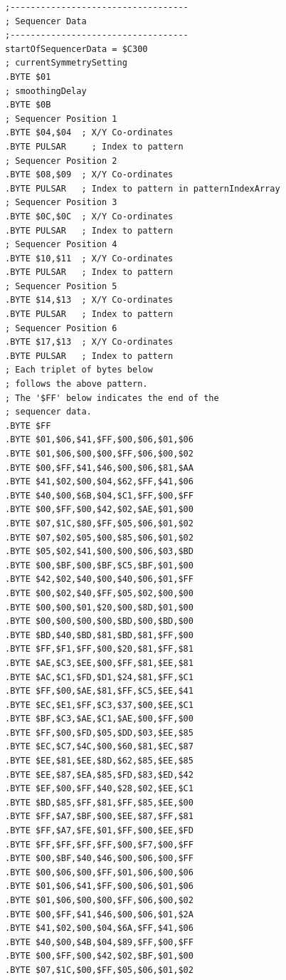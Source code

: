 \clearpage
\begin{minipage}[b]{0.33\linewidth}
\begin{lrbox}{\mybox}%
\begin{lstlisting}[basicstyle=\ttfamily\tiny]
;-----------------------------------
; Sequencer Data
;-----------------------------------
startOfSequencerData = $C300
; currentSymmetrySetting
.BYTE $01
; smoothingDelay
.BYTE $0B
; Sequencer Position 1
.BYTE $04,$04  ; X/Y Co-ordinates
.BYTE PULSAR     ; Index to pattern    
; Sequencer Position 2
.BYTE $08,$09  ; X/Y Co-ordinates
.BYTE PULSAR   ; Index to pattern in patternIndexArray   
; Sequencer Position 3
.BYTE $0C,$0C  ; X/Y Co-ordinates
.BYTE PULSAR   ; Index to pattern
; Sequencer Position 4
.BYTE $10,$11  ; X/Y Co-ordinates
.BYTE PULSAR   ; Index to pattern
; Sequencer Position 5
.BYTE $14,$13  ; X/Y Co-ordinates
.BYTE PULSAR   ; Index to pattern
; Sequencer Position 6
.BYTE $17,$13  ; X/Y Co-ordinates
.BYTE PULSAR   ; Index to pattern
; Each triplet of bytes below
; follows the above pattern.
; The '$FF' below indicates the end of the
; sequencer data.
.BYTE $FF
.BYTE $01,$06,$41,$FF,$00,$06,$01,$06
.BYTE $01,$06,$00,$00,$FF,$06,$00,$02
.BYTE $00,$FF,$41,$46,$00,$06,$81,$AA
.BYTE $41,$02,$00,$04,$62,$FF,$41,$06
.BYTE $40,$00,$6B,$04,$C1,$FF,$00,$FF
.BYTE $00,$FF,$00,$42,$02,$AE,$01,$00
.BYTE $07,$1C,$80,$FF,$05,$06,$01,$02
.BYTE $07,$02,$05,$00,$85,$06,$01,$02
.BYTE $05,$02,$41,$00,$00,$06,$03,$BD
.BYTE $00,$BF,$00,$BF,$C5,$BF,$01,$00
.BYTE $42,$02,$40,$00,$40,$06,$01,$FF
.BYTE $00,$02,$40,$FF,$05,$02,$00,$00
.BYTE $00,$00,$01,$20,$00,$8D,$01,$00
.BYTE $00,$00,$00,$00,$BD,$00,$BD,$00
.BYTE $BD,$40,$BD,$81,$BD,$81,$FF,$00
.BYTE $FF,$F1,$FF,$00,$20,$81,$FF,$81
.BYTE $AE,$C3,$EE,$00,$FF,$81,$EE,$81
.BYTE $AC,$C1,$FD,$D1,$24,$81,$FF,$C1
.BYTE $FF,$00,$AE,$81,$FF,$C5,$EE,$41
.BYTE $EC,$E1,$FF,$C3,$37,$00,$EE,$C1
.BYTE $BF,$C3,$AE,$C1,$AE,$00,$FF,$00
.BYTE $FF,$00,$FD,$05,$DD,$03,$EE,$85
.BYTE $EC,$C7,$4C,$00,$60,$81,$EC,$87
.BYTE $EE,$81,$EE,$8D,$62,$85,$EE,$85
.BYTE $EE,$87,$EA,$85,$FD,$83,$ED,$42
.BYTE $EF,$00,$FF,$40,$28,$02,$EE,$C1
.BYTE $BD,$85,$FF,$81,$FF,$85,$EE,$00
.BYTE $FF,$A7,$BF,$00,$EE,$87,$FF,$81
.BYTE $FF,$A7,$FE,$01,$FF,$00,$EE,$FD
.BYTE $FF,$FF,$FF,$FF,$00,$F7,$00,$FF
.BYTE $00,$BF,$40,$46,$00,$06,$00,$FF
.BYTE $00,$06,$00,$FF,$01,$06,$00,$06
.BYTE $01,$06,$41,$FF,$00,$06,$01,$06
.BYTE $01,$06,$00,$00,$FF,$06,$00,$02
.BYTE $00,$FF,$41,$46,$00,$06,$01,$2A
.BYTE $41,$02,$00,$04,$6A,$FF,$41,$06
.BYTE $40,$00,$4B,$04,$89,$FF,$00,$FF
.BYTE $00,$FF,$00,$42,$02,$BF,$01,$00
.BYTE $07,$1C,$00,$FF,$05,$06,$01,$02

\end{lstlisting}
\end{lrbox}
\end{minipage}
